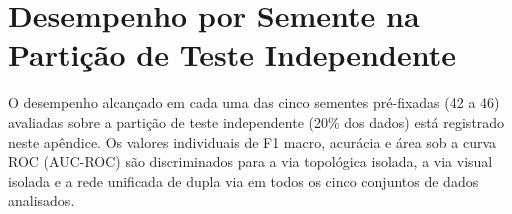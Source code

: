 \chapter{Desempenho por Semente na Partição de Teste Independente}
\label{apendice:holdout}

O desempenho alcançado em cada uma das cinco sementes pré-fixadas (42 a 46) avaliadas sobre a partição de teste independente (20\% dos dados) está registrado neste apêndice. Os valores individuais de F1 macro, acurácia e área sob a curva ROC (AUC-ROC) são discriminados para a via topológica isolada, a via visual isolada e a rede unificada de dupla via em todos os cinco conjuntos de dados analisados.

\begin{table}[H]
\centering
\caption{Resultados detalhados por semente e médias consolidadas no teste independente (20\% dos dados).}
\label{tab:apendice-holdout}
\small
{}
\end{table}
